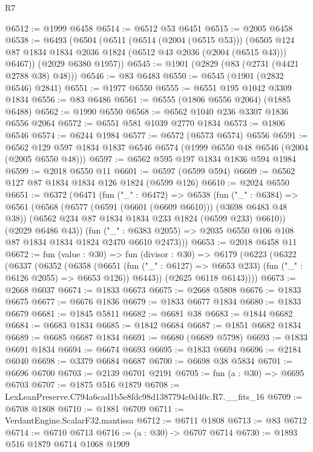 \begin{lexlean}{R7}
\begin{coremodule}
@6512 := @1999 @6458
@6514 := @6512 @53 @6451
@6515 := @2005 @6458
@6538 := @6493
    (@6504
      (@6511
        (@6514 (@2004 (@6515 @53)))
        (@6505 @124 @87 @1834 @1834 @2036 @1824 (@6512 @43 @2036 (@2004 (@6515 @43))) @6467))
      (@2029 @6380 @1957))
@6545 := @1901 (@2829 (@83 (@2731 (@4421 @2788 @38) @48)))
@6546 := @83 @6483
@6550 := @6545 (@1901 (@2832 @6546) @2841)
@6551 := @1977 @6550
@6555 := @6551 @195 @1042 @3309 @1834
@6556 := @83 @6486
@6561 := @6555 (@1806 @6556 @2064) (@1885 @6488)
@6562 := @1990 @6550
@6568 := @6562 @1040 @236 @3307 @1836 @6556 @2064
@6572 := @6551 @581 @1039 @2770 @1834
@6573 := @1806 @6546
@6574 := @6244 @1984
@6577 := @6572 (@6573 @6574) @6556
@6591 := @6562 @129 @597 @1834 @1837 @6546 @6574 (@1999 @6550 @48 @6546 (@2004 (@2005 @6550 @48)))
@6597 := @6562 @595 @197 @1834 @1836 @594 @1984
@6599 := @2018 @6550 @11
@6601 := @6597 (@6599 @594)
@6609 := @6562 @127 @87 @1834 @1834 @126 @1824 (@6599 @126)
@6610 := @2024 @6550
@6651 := @6372
    (@6471
      (fun ("_" : @6472) =>
      @6538
        (fun ("_" : @6384) =>
        @6561
          (@6568
            (@6577 (@6591 (@6601 (@6609 @6610))) (@3698 @6483 @48 @38))
            (@6562 @234 @87 @1834 @1834 @233 @1824 (@6599 @233) @6610))
          (@2029 @6486 @43))
        (fun ("_" : @6383 @2055) => @2035 @6550 @106 @108 @87 @1834 @1834 @1824 @2470 @6610 @2473)))
@6653 := @2018 @6458 @11
@6672 := fun (value : @30) =>
  fun (divisor : @30) =>
  @6179
    (@6223
      (@6322
        (@6337
          (@6352
            (@6358
              (@6651 (fun ("_" : @6127) => @6653 @233) (fun ("_" : @6126 @2055) => @6653 @126))
              @6443))
          (@2625 @6118 @6143))))
@6673 := @2668 @6037
@6674 := @1833 @6673
@6675 := @2668 @5808
@6676 := @1833 @6675
@6677 := @6676 @1836
@6679 := @1833 @6677 @1834
@6680 := @1833 @6679
@6681 := @1845 @5811
@6682 := @6681 @38
@6683 := @1844 @6682
@6684 := @6683 @1834
@6685 := @1842 @6684
@6687 := @1851 @6682 @1834
@6689 := @6685 @6687 @1834
@6691 := @6680 (@6689 @5798)
@6693 := @1833 @6691 @1834
@6694 := @6674 @6693
@6695 := @1833 @6694
@6696 := @2184 @6040
@6698 := @3379 @6684 @6687
@6700 := @6698 @38 @5834
@6701 := @6696 @6700
@6703 := @2139 @6701 @2191
@6705 := fun (a : @30) => @6695 @6703
@6707 := @1875 @516 @1879
@6708 := LexLeanPreserve.C794a6cad1b5e8fdc98d1387794c0d40c.R7.__fits_16
@6709 := @6708 @1808
@6710 := @1881 @6709
@6711 := VerdantEngine.ScalarF32.mantissa
@6712 := @6711 @1808
@6713 := @83 @6712
@6714 := @6710 @6713
@6716 := (a : @30) -> @6707 @6714
@6730 := @1893
    @516
    @1879
    @6714
    @1068
    @1909

\end{coremodule}
\end{lexlean}
